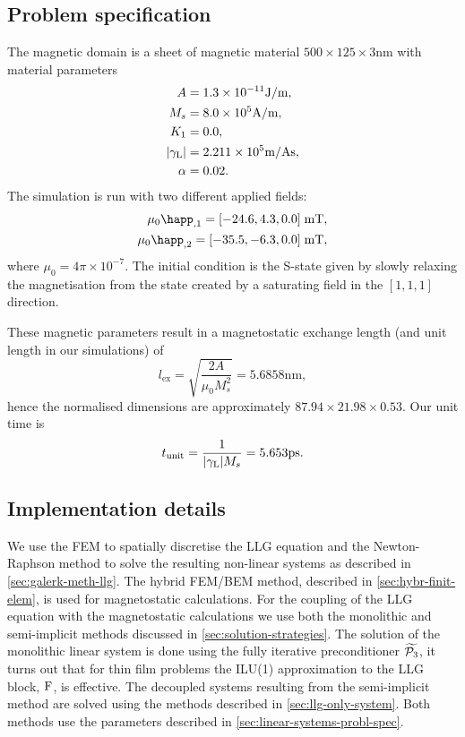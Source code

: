 \subsection{Problem specification}

The magnetic domain is a sheet of magnetic material $500 \times 125 \times 3$nm with material parameters
\begin{equation}
  \begin{aligned}
    A &= 1.3\times 10^{-11} \text{J/m}, \\
    M_s &= 8.0\times 10^{5} \text{A/m}, \\
    K_1 &= 0.0, \\
    {\left|{\gamma_{\mathrm{\tiny{L}}}} \right|} &= 2.211 \times 10^{5} \text{m/As}, \\
    \alpha &= 0.02.
  \end{aligned}
\end{equation}
The simulation is run with two different applied fields:
\begin{equation}
  \begin{aligned}
    \mu_0 \happ_{,1} = [-24.6, 4.3, 0.0] \;\text{mT}, \\
    \mu_0 \happ_{,2} = [-35.5, -6.3, 0.0] \;\text{mT}, \\
  \end{aligned}
  \label{eq:mumag-h-app}
\end{equation}
where $\mu_0 = 4\pi\times10^{-7}$.
The initial condition is the S-state given by slowly relaxing the magnetisation from the state created by a saturating field in the $[1,1,1]$ direction.

These magnetic parameters result in a magnetostatic exchange length (and unit length in our simulations) of
\begin{equation}
  l_{\text{ex}} = \sqrt{\frac{2A}{\mu_0 M_s^2}} = 5.6858\text{nm},
\end{equation}
hence the normalised dimensions are approximately $87.94 \times 21.98 \times 0.53$.
Our unit time is
\begin{equation}
  t_{\text{unit}} = \frac{1}{{\left|{\gamma_{\mathrm{\tiny{L}}}} \right|} M_s} = 5.653\text{ps}.
\end{equation}


\subsection{Implementation details}

We use the FEM to spatially discretise the LLG equation and the Newton-Raphson method to solve the resulting non-linear systems as described in \cref{sec:galerk-meth-llg}.
The hybrid FEM/BEM method, described in \cref{sec:hybr-finit-elem}, is used for magnetostatic calculations.
For the coupling of the LLG equation with the magnetostatic calculations we use both the monolithic and semi-implicit methods discussed in \cref{sec:solution-strategies}.
The solution of the monolithic linear system is done using the fully iterative preconditioner $\widetilde{\mathcal{P}_3}$, it turns out that for thin film problems the ILU(1) approximation to the LLG block, $\mathrm{F}$, is effective.
The decoupled systems resulting from the semi-implicit method are solved using the methods described in \cref{sec:llg-only-system}.
Both methods use the parameters described in \cref{sec:linear-systems-probl-spec}.

